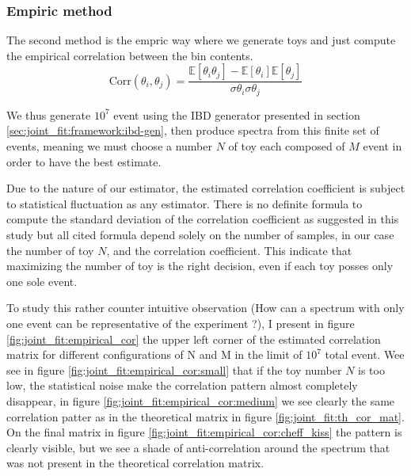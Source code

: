 \documentclass[../main.tex]{subfiles}
\begin{document}
\subsubsection{Empiric method}

The second method is the empric way where we generate toys and just compute the empirical correlation between the bin contents.
\begin{equation}
  \mathrm{Corr}(\theta_i, \theta_j) = \frac{\mathbb{E}[\theta_i \theta_j] - \mathbb{E}[\theta_i] \mathbb{E}[\theta_j]}{\sigma \theta_i \sigma \theta_j}
\end{equation}

We thus generate $10^7$ event using the IBD generator presented in section \ref{sec:joint_fit:framework:ibd-gen}, then produce spectra from this finite set of events, meaning we must choose a number $N$ of toy each composed of $M$ event in order to have the best estimate.

Due to the nature of our estimator, the estimated correlation coefficient is subject to statistical fluctuation as any estimator. There is no definite formula to compute the standard deviation of the correlation coefficient as suggested in this study \cite{gnambs_brief_2023} but all cited formula depend solely on the number of samples, in our case the number of toy $N$, and the correlation coefficient. This indicate that maximizing the number of toy is the right decision, even if each toy posses only one sole event.

To study this rather counter intuitive observation (How can a spectrum with only one event can be representative of the experiment ?), I present in figure \ref{fig:joint_fit:empirical_cor} the upper left corner of the estimated correlation matrix for different configurations of N and M in the limit of $10^7$ total event. Wee see in figure \ref{fig:joint_fit:empirical_cor:small} that if the toy number $N$ is too low, the statistical noise make the correlation pattern almost completely disappear, in figure \ref{fig:joint_fit:empirical_cor:medium} we see clearly the same correlation patter as in the theoretical matrix in figure \ref{fig:joint_fit:th_cor_mat}.
On the final matrix in figure \ref{fig:joint_fit:empirical_cor:cheff_kiss} the pattern is clearly visible, but we see a shade of anti-correlation around the spectrum that was not present in the theoretical correlation matrix.
\end{document}
